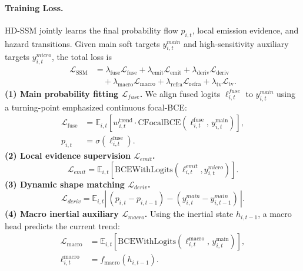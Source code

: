\documentclass[letterpaper]{article} %
\begin{document}
\paragraph{Training Loss.} 
HD-SSM jointly learns the final probability flow $p_{i,t}$, local emission evidence, and hazard transitions.
Given main soft targets $y^{main}_{i,t}$ and high-sensitivity auxiliary targets $y^{micro}_{i,t}$, the total loss is
\begin{equation}
\begin{aligned}
\mathcal{L}_{\mathrm{SSM}}
&=\lambda_{\mathrm{fuse}}\mathcal{L}_{\mathrm{fuse}}
+\lambda_{\mathrm{emit}}\mathcal{L}_{\mathrm{emit}}
+\lambda_{\mathrm{deriv}}\mathcal{L}_{\mathrm{deriv}}\\
&\quad
+\lambda_{\mathrm{macro}}\mathcal{L}_{\mathrm{macro}}
+\lambda_{\mathrm{refra}}\mathcal{L}_{\mathrm{refra}}
+\lambda_{\mathrm{tv}}\mathcal{L}_{\mathrm{tv}}.
\end{aligned}
\end{equation}
\textbf{(1) Main probability fitting $\mathcal{L}_{fuse}$.}
We align fused logits $\ell^{fuse}_{i,t}$ to $y^{main}_{i,t}$ using a turning-point emphasized continuous focal-BCE:
\begin{equation}
\begin{aligned}
\mathcal{L}_{\mathrm{fuse}}
&=\mathbb{E}_{i,t}\!\left[
w^{\mathrm{trend}}_{i,t}\cdot
\mathrm{CFocalBCE}\!\left(\ell^{\mathrm{fuse}}_{i,t},\,y^{\mathrm{main}}_{i,t}\right)
\right],\\
p_{i,t} &= \sigma\!\left(\ell^{\mathrm{fuse}}_{i,t}\right).
\end{aligned}
\end{equation}
\textbf{(2) Local evidence supervision $\mathcal{L}_{emit}$.}
\begin{equation}
\mathcal{L}_{emit}=\mathbb{E}_{i,t}\!\left[\mathrm{BCEWithLogits}(\ell^{emit}_{i,t},y^{micro}_{i,t})\right].
\end{equation}
\textbf{(3) Dynamic shape matching $\mathcal{L}_{deriv}$.}
\begin{equation}
\mathcal{L}_{deriv}=\mathbb{E}_{i,t}\!\left|\,(p_{i,t}-p_{i,t-1})-(y^{main}_{i,t}-y^{main}_{i,t-1})\,\right|.
\end{equation}
\textbf{(4) Macro inertial auxiliary $\mathcal{L}_{macro}$.}
Using the inertial state $h_{i,t-1}$, a macro head predicts the current trend:
\begin{equation}
\begin{aligned}
\mathcal{L}_{\mathrm{macro}}
&=\mathbb{E}_{i,t}\!\left[
\mathrm{BCEWithLogits}\!\left(\ell^{\mathrm{macro}}_{i,t},\,y^{\mathrm{main}}_{i,t}\right)
\right],\\
\ell^{\mathrm{macro}}_{i,t}
&= f_{\mathrm{macro}}\!\left(h_{i,t-1}\right).
\end{aligned}
\end{equation}
\end{document}
